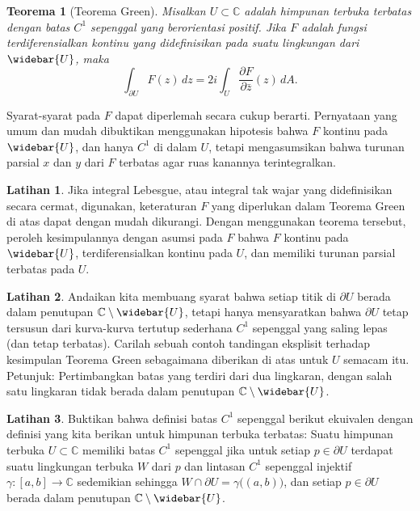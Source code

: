 \documentclass[12pt,openany]{book}
\newcommand{\C}{{\mathbb{C}}}
\theoremstyle{plain}
\newtheorem{thm}{Teorema}[section]
\theoremstyle{remark}
\theoremstyle{definition}
\newenvironment{exbox}{%
    \def\FrameCommand{\vrule width 1pt \relax\hspace{10pt}}%
    \MakeFramed{\advance\hsize-\width\FrameRestore}%
}{%
    \endMakeFramed
}
\theoremstyle{exercise}
\newtheorem{exercise}{Latihan}[section]
\theoremstyle{example}
\begin{document}
\begin{thm}[Teorema Green] \label{thm:greens2}
\pagebreak[2]
Misalkan $U \subset \C$ adalah himpunan terbuka terbatas dengan
batas $C^1$ sepenggal yang berorientasi positif.
Jika $F$ adalah fungsi terdiferensialkan kontinu yang didefinisikan pada suatu lingkungan
dari $\widebar{U}$, maka
\begin{equation*}
\int_{\partial U} F(z) \, dz
=
2i
\int_{U}
\frac{\partial F}{\partial \bar{z}}(z)
\, dA .
\end{equation*}
\end{thm}

Syarat-syarat pada $F$ dapat diperlemah secara cukup berarti.
Pernyataan yang umum dan mudah dibuktikan menggunakan hipotesis bahwa $F$ kontinu pada
$\widebar{U}$, dan hanya $C^1$
di dalam $U$, tetapi mengasumsikan bahwa turunan parsial $x$ dan $y$ dari $F$ terbatas agar
ruas kanannya terintegralkan.

\begin{exbox}
\begin{exercise}
\pagebreak[2]
Jika integral Lebesgue, atau integral tak wajar yang didefinisikan secara cermat, digunakan,
keteraturan $F$ yang diperlukan dalam Teorema Green di atas dapat dengan mudah dikurangi.
Dengan menggunakan teorema tersebut, peroleh kesimpulannya dengan
asumsi pada $F$ bahwa $F$ kontinu pada $\widebar{U}$,
terdiferensialkan kontinu pada $U$, dan memiliki turunan parsial terbatas pada $U$.
\end{exercise}

\begin{exercise}
Andaikan kita membuang syarat bahwa setiap titik di $\partial U$ berada dalam
penutupan $\C \setminus \widebar{U}$, tetapi hanya mensyaratkan bahwa $\partial U$ tetap
tersusun dari kurva-kurva tertutup sederhana $C^1$ sepenggal yang saling lepas (dan tetap terbatas).
Carilah sebuah contoh tandingan eksplisit terhadap kesimpulan
Teorema Green sebagaimana diberikan di atas untuk $U$ semacam itu.
Petunjuk: Pertimbangkan batas yang terdiri dari dua
lingkaran, dengan salah satu lingkaran tidak berada dalam penutupan
$\C \setminus \widebar{U}$.
\end{exercise}

\begin{exercise}
Buktikan bahwa definisi batas $C^1$ sepenggal berikut
ekuivalen dengan definisi yang kita berikan untuk himpunan terbuka terbatas: Suatu himpunan terbuka $U \subset
\C$ memiliki batas $C^1$ sepenggal jika untuk setiap $p \in \partial U$
terdapat suatu lingkungan terbuka $W$ dari $p$ dan lintasan $C^1$ sepenggal injektif $\gamma
\colon [a,b] \to \C$ sedemikian sehingga $W \cap \partial U =
\gamma\bigl((a,b)\bigr)$, dan setiap $p \in \partial U$ berada dalam penutupan
$\C \setminus \widebar{U}$.
\end{exercise}
\end{exbox}
\end{document}
